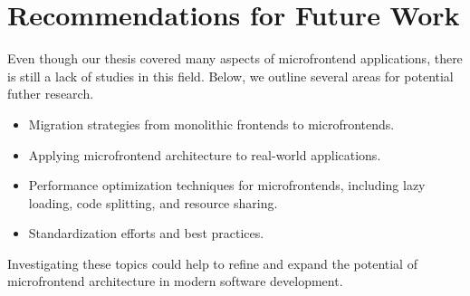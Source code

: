\section{Recommendations for Future Work}
Even though our thesis covered many aspects of microfrontend applications, there is still a lack of studies in this field. Below, we outline several areas for potential futher research.
\begin{itemize}
    \item Migration strategies from monolithic frontends to microfrontends.
    \item Applying microfrontend architecture to real-world applications.
    \item Performance optimization techniques for microfrontends, including lazy loading, code splitting, and resource sharing.
    \item Standardization efforts and best practices.
\end{itemize}
Investigating these topics could help to refine and expand the potential of microfrontend architecture in modern software development.
